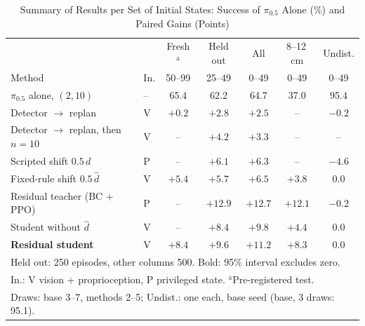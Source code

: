 \documentclass[conference,a4paper]{IEEEtran}
\begin{document}
\begin{table}[t]
\caption{Summary of Results per Set of Initial States: Success of $\pi_{0.5}$ Alone (\%) and Paired Gains (Points)}
\label{tab:rec}
\centering
\scriptsize
\setlength{\tabcolsep}{2.2pt}
\begin{tabular}{llccccc}
\toprule
 & & Fresh$^{\mathrm{a}}$ & Held out & All & 8--12\,cm & Undist. \\
Method & In. & 50--99 & 25--49 & 0--49 & 0--49 & 0--49 \\
\midrule
$\pi_{0.5}$ alone, $(2,10)$ & -- & 65.4 & 62.2 & 64.7 & 37.0 & 95.4 \\
Detector $\rightarrow$ replan & V & $+0.2$ & $\mathbf{+2.8}$ & $\mathbf{+2.5}$ & -- & $-0.2$ \\
Detector $\rightarrow$ replan, then $n{=}10$ & V & -- & $\mathbf{+4.2}$ & $\mathbf{+3.3}$ & -- & -- \\
Scripted shift $0.5\,d$ & P & -- & $\mathbf{+6.1}$ & $\mathbf{+6.3}$ & -- & $\mathbf{-4.6}$ \\
Fixed-rule shift $0.5\,\hat d$ & V & $\mathbf{+5.4}$ & $\mathbf{+5.7}$ & $\mathbf{+6.5}$ & $\mathbf{+3.8}$ & $0.0$ \\
Residual teacher (BC + PPO) & P & -- & $\mathbf{+12.9}$ & $\mathbf{+12.7}$ & $\mathbf{+12.1}$ & $-0.2$ \\
Student without $\hat d$ & V & -- & $\mathbf{+8.4}$ & $\mathbf{+9.8}$ & $\mathbf{+4.4}$ & $0.0$ \\
\textbf{Residual student} & V & $\mathbf{+8.4}$ & $\mathbf{+9.6}$ & $\mathbf{+11.2}$ & $\mathbf{+8.3}$ & $0.0$ \\
\bottomrule
\multicolumn{7}{l}{\scriptsize Held out: 250 episodes, other columns 500. Bold: 95\% interval excludes zero.} \\
\multicolumn{7}{l}{\scriptsize In.: V vision + proprioception, P privileged state. $^{\mathrm{a}}$Pre-registered test.} \\
\multicolumn{7}{l}{\scriptsize Draws: base 3--7, methods 2--5; Undist.: one each, base seed (base, 3 draws: 95.1).}
\end{tabular}
\end{table}
\end{document}
